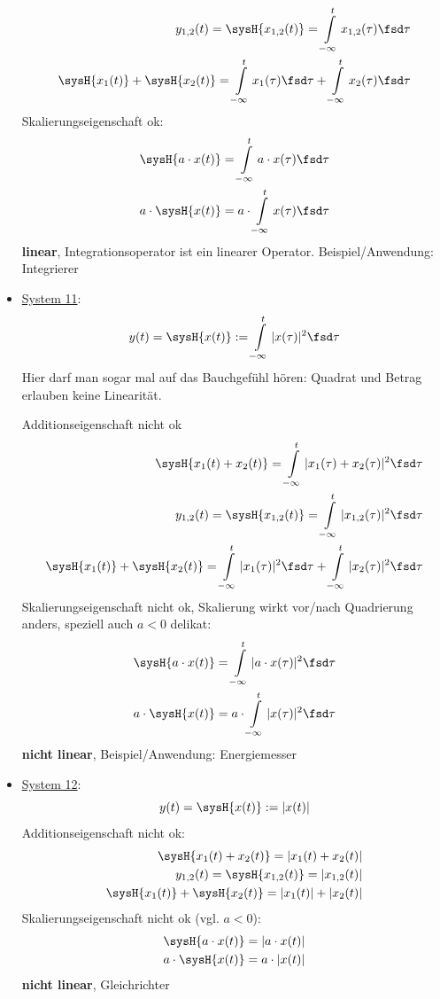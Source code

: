 \begin{Loesung}
\begin{itemize}
\begin{align}
y_{1,2}(t) = \sysH{x_{1,2}(t)}= \int\limits_{-\infty}^{t} x_{1,2}(\tau) \fsd \tau\\
\sysH{x_1(t)} + \sysH{x_2(t)} = \int\limits_{-\infty}^{t} x_1(\tau) \fsd \tau + \int\limits_{-\infty}^{t} x_2(\tau) \fsd \tau
\end{align}
Skalierungseigenschaft ok:
\begin{align}
\sysH{a \cdot x(t)}= \int\limits_{-\infty}^{t} a \cdot x(\tau) \fsd \tau\\
a \cdot \sysH{x(t)}= a \cdot \int\limits_{-\infty}^{t} x(\tau) \fsd \tau
\end{align}
\textbf{linear}, Integrationsoperator ist ein linearer Operator.
Beispiel/Anwendung: Integrierer
\item  \underline{System 11}:
\begin{equation}
y(t) = \sysH{x(t)}:= \int\limits_{-\infty}^{t} |x(\tau)|^2 \fsd \tau
\end{equation}
Hier darf man sogar mal auf das Bauchgefühl hören: Quadrat und Betrag erlauben
keine Linearität.

Additionseigenschaft nicht ok
\begin{align}
\sysH{x_1(t)+x_2(t)}= \int\limits_{-\infty}^{t} |x_1(\tau)+x_2(\tau)|^2 \fsd \tau\\
y_{1,2}(t) = \sysH{x_{1,2}(t)}= \int\limits_{-\infty}^{t} |x_{1,2}(\tau)|^2 \fsd \tau\\
\sysH{x_1(t)} + \sysH{x_2(t)} = \int\limits_{-\infty}^{t} |x_{1}(\tau)|^2 \fsd \tau+\int\limits_{-\infty}^{t} |x_{2}(\tau)|^2 \fsd \tau
\end{align}
Skalierungseigenschaft nicht ok, Skalierung wirkt vor/nach Quadrierung anders,
speziell auch $a<0$ delikat:
\begin{align}
\sysH{a \cdot x(t)}= \int\limits_{-\infty}^{t} |a \cdot x(\tau)|^2 \fsd \tau\\
a \cdot \sysH{x(t)}= a\cdot \int\limits_{-\infty}^{t} |x(\tau)|^2 \fsd \tau
\end{align}
\textbf{nicht linear}, Beispiel/Anwendung: Energiemesser
\item  \underline{System 12}:
\begin{equation}
y(t) = \sysH{x(t)}:= |x(t)|
\end{equation}
Additionseigenschaft nicht ok:
\begin{align}
\sysH{x_1(t)+x_2(t)}= |x_1(t) + x_2(t)|\\
y_{1,2}(t) = \sysH{x_{1,2}(t)}= |x_{1,2}(t)|\\
\sysH{x_1(t)} + \sysH{x_2(t)} = |x_1(t)| + |x_2(t)|
\end{align}
Skalierungseigenschaft nicht ok (vgl. $a<0$):
\begin{align}
\sysH{a \cdot x(t)}= |a \cdot x(t)|\\
a \cdot \sysH{x(t)}= a \cdot |x(t)|
\end{align}
\textbf{nicht linear}, Gleichrichter


\end{itemize}
\end{Loesung}
